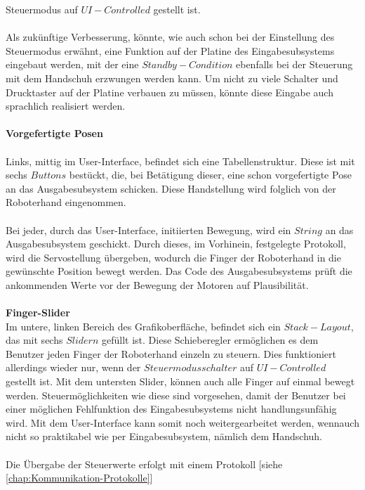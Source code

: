 \documentclass[titlepage,12pt,twoside]{article}
\begin{document}
Steuermodus auf $UI-Controlled$ gestellt ist. \\
\\
Als zukünftige Verbesserung, könnte, wie auch schon bei der Einstellung des Steuermodus erwähnt, eine Funktion auf der Platine des Eingabesubsystems eingebaut werden, mit der eine $Standby-Condition$
ebenfalls bei der Steuerung mit dem Handschuh erzwungen werden kann. Um nicht zu viele Schalter und Drucktaster auf der Platine verbauen zu müssen, könnte diese Eingabe auch sprachlich realisiert werden. \\
\\
\textbf{Vorgefertigte Posen} \\
\\
Links, mittig im User-Interface, befindet sich eine Tabellenstruktur. Diese ist mit sechs $Buttons$ bestückt, die, bei Betätigung dieser, eine schon vorgefertigte Pose an das Ausgabesubsystem schicken. Diese Handstellung
wird folglich von der Roboterhand eingenommen. \\
\\
Bei jeder, durch das User-Interface, initiierten Bewegung, wird ein $String$ an das Ausgabesubsystem geschickt. Durch dieses, im Vorhinein, festgelegte Protokoll, wird die Servostellung übergeben, wodurch die Finger der
Roboterhand in die gewünschte Position bewegt werden. Das Code des Ausgabesubsystems prüft die ankommenden Werte vor der Bewegung der Motoren auf Plausibilität. \\
\\
\textbf{Finger-Slider} \\
Im untere, linken Bereich des Grafikoberfläche, befindet sich ein $Stack-Layout$, das mit sechs $Slidern$ gefüllt ist. Diese Schieberegler ermöglichen es dem Benutzer jeden Finger der Roboterhand einzeln zu steuern. Dies
funktioniert allerdings wieder nur, wenn der $Steuermodusschalter$ auf $UI-Controlled$ gestellt ist. Mit dem untersten Slider, können auch alle Finger auf einmal bewegt werden. Steuermöglichkeiten wie diese sind vorgesehen, 
damit der Benutzer bei einer möglichen Fehlfunktion des Eingabesubsystems nicht handlungsunfähig wird. Mit dem User-Interface kann somit noch weitergearbeitet werden, wennauch nicht so praktikabel wie per Eingabesubsystem, nämlich dem Handschuh. \\
\\
Die Übergabe der Steuerwerte erfolgt mit einem Protokoll [siehe \textcolor{blue}{\autoref{chap:Kommunikation-Protokolle}}] \\
\\
\end{document}
